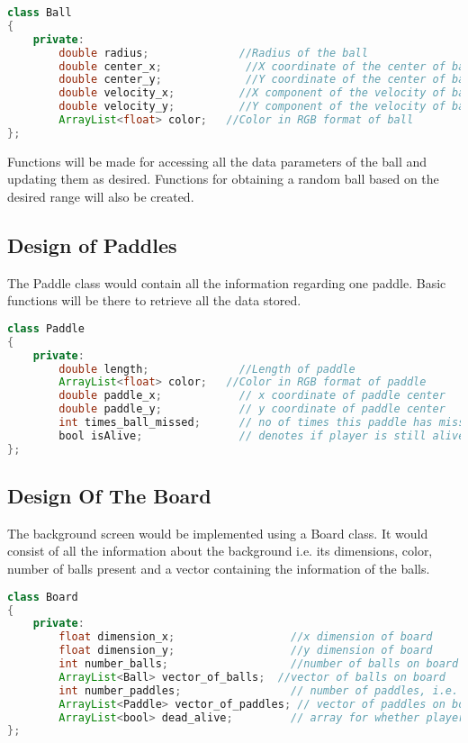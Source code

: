 \documentclass{article}
\begin{document}
\begin{lstlisting}[language=Java, caption={Class Parameters for Ball}]
class Ball
{
	private:
		double radius;              //Radius of the ball
		double center_x;             //X coordinate of the center of ball
		double center_y;             //Y coordinate of the center of ball
		double velocity_x;          //X component of the velocity of ball
		double velocity_y;          //Y component of the velocity of ball
		ArrayList<float> color;   //Color in RGB format of ball
};

\end{lstlisting}

Functions will be made for accessing all the data parameters of the ball and updating them as desired. Functions for obtaining a random ball based on the desired range will also be created.

\subsection{Design of Paddles} The Paddle class would contain all the information regarding one paddle. Basic functions will be there to retrieve all the data stored.

\begin{lstlisting}[language=Java, caption={Class Parameters for Paddle}]
class Paddle
{
	private:
		double length;              //Length of paddle
		ArrayList<float> color;   //Color in RGB format of paddle
		double paddle_x;			// x coordinate of paddle center
		double paddle_y;			// y coordinate of paddle center
		int times_ball_missed;		// no of times this paddle has missed ball
		bool isAlive;				// denotes if player is still alive
};

\end{lstlisting}

\subsection{Design Of The Board} The background screen would be implemented using a Board class. It would consist of all the information about the background i.e. its dimensions, color, number of balls present and a vector containing the information of the balls.

\begin{lstlisting}[language=Java, caption={Class Parameters for Board}]
class Board
{
	private:
		float dimension_x;                  //x dimension of board
		float dimension_y;                  //y dimension of board
		int number_balls;                   //number of balls on board
		ArrayList<Ball> vector_of_balls;  //vector of balls on board
		int number_paddles;					// number of paddles, i.e. players
		ArrayList<Paddle> vector_of_paddles; // vector of paddles on board
		ArrayList<bool> dead_alive;			// array for whether player is alive/dead
};

\end{lstlisting}
\end{document}
